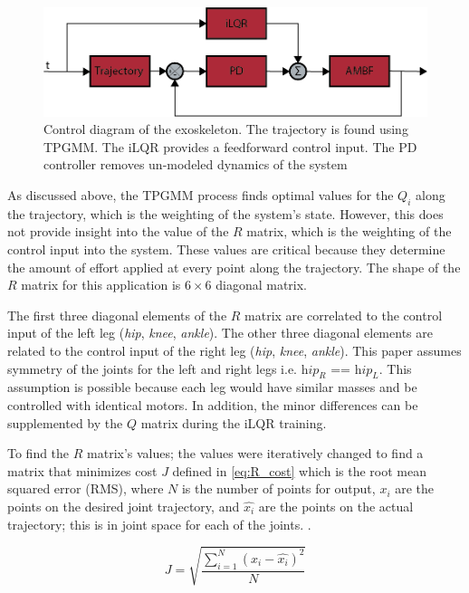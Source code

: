 \begin{figure}[H]
    \centering
    \includegraphics[width=\linewidth]{images/controllers/iLQR.png}
    \caption[iLQR Control Diagram]{Control diagram of the exoskeleton. The trajectory is found using TPGMM. The iLQR provides a feedforward control input. The PD controller removes un-modeled dynamics of the system }
    \label{fig:controller}
\end{figure}

As discussed above, the TPGMM process finds optimal values for the $Q_i$ along the trajectory, which is the weighting of the system's state. However, this does not provide insight into the value of the $R$ matrix, which is the weighting of the control input into the system. These values are critical because they determine the amount of effort applied at every point along the trajectory. The shape of the $R$ matrix for this application is $6 \times 6$ diagonal matrix.


The first three diagonal elements of the $R$ matrix are correlated to the control input of the left leg (\textit{hip}, \textit{knee}, \textit{ankle}). The other three diagonal elements are related to the control input of the right leg (\textit{hip}, \textit{knee}, \textit{ankle}). This paper assumes symmetry of the joints for the left and right legs i.e. $\textit{hip}_R$ == $\textit{hip}_L$.  This assumption is possible because each leg would have similar masses and be controlled with identical motors. In addition, the minor differences can be supplemented by the $Q$ matrix during the iLQR training.  

To find the $R$ matrix's values; the values were iteratively changed to find a matrix that minimizes cost $J$ defined in \autoref{eq:R_cost} which is the root mean squared error (RMS), where $N$ is the number of points for output, $x_i$ are the points on the desired joint trajectory, and $\hat{x_i}$ are the points on the actual trajectory; this is in joint space for each of the joints. 
 \cite{chai2014root}.

\begin{equation}
    J = \sqrt{\frac{\sum_{i=1}^N(x_i-\hat{x_i})^2}{N}}
    \label{eq:R_cost}
\end{equation}

